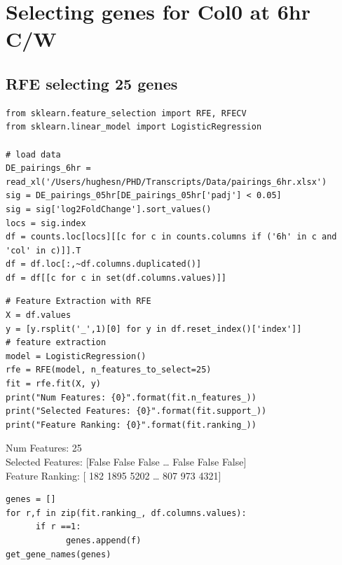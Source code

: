 \documentclass[11pt]{article}
\begin{document}
\section{Selecting genes for Col0 at 6hr C/W}
\label{sec:orgfce5a08}
\subsection{RFE selecting 25 genes}
\label{sec:org40e19c7}
\begin{verbatim}
from sklearn.feature_selection import RFE, RFECV
from sklearn.linear_model import LogisticRegression

# load data
DE_pairings_6hr = read_xl('/Users/hughesn/PHD/Transcripts/Data/pairings_6hr.xlsx')
sig = DE_pairings_05hr[DE_pairings_05hr['padj'] < 0.05]
sig = sig['log2FoldChange'].sort_values()
locs = sig.index
df = counts.loc[locs][[c for c in counts.columns if ('6h' in c and 'col' in c)]].T
df = df.loc[:,~df.columns.duplicated()]
df = df[[c for c in set(df.columns.values)]]
\end{verbatim}

\begin{verbatim}
# Feature Extraction with RFE
X = df.values
y = [y.rsplit('_',1)[0] for y in df.reset_index()['index']]
# feature extraction
model = LogisticRegression()
rfe = RFE(model, n_features_to_select=25)
fit = rfe.fit(X, y)
print("Num Features: {0}".format(fit.n_features_))
print("Selected Features: {0}".format(fit.support_))
print("Feature Ranking: {0}".format(fit.ranking_))
\end{verbatim}

Num Features: 25\\
Selected Features: [False False False \ldots{} False False False]\\
Feature Ranking: [ 182 1895 5202 \ldots{}  807  973 4321]\\


\begin{verbatim}
genes = []
for r,f in zip(fit.ranking_, df.columns.values):
      if r ==1:
            genes.append(f)
get_gene_names(genes)
\end{verbatim}
\end{document}
